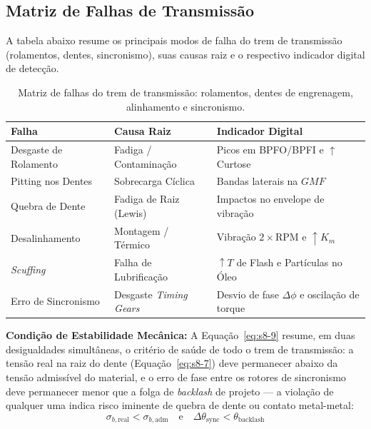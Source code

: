 \documentclass[12pt,a4paper]{article}
\numberwithin{equation}{section}
\numberwithin{table}{section}
\numberwithin{figure}{section}
\begin{document}
	\subsection{\textbf{Matriz de Falhas de Transmissão}}
	A tabela abaixo resume os principais modos de falha do trem de transmissão (rolamentos, dentes, sincronismo), suas causas raiz e o respectivo indicador digital de detecção.
	\begin{table}[h!]
		\centering
		\small
		\renewcommand{\arraystretch}{1.5}
		\begin{tabular}{|l|l|l|}
			\hline
			\textbf{Falha} & \textbf{Causa Raiz} & \textbf{Indicador Digital} \\ \hline
			Desgaste de Rolamento & Fadiga / Contaminação & Picos em BPFO/BPFI e $\uparrow$ Curtose \\ \hline
			Pitting nos Dentes & Sobrecarga Cíclica & Bandas laterais na $GMF$ \\ \hline
			Quebra de Dente & Fadiga de Raiz (Lewis) & Impactos no envelope de vibração \\ \hline
			Desalinhamento & Montagem / Térmico & Vibração $2 \times \text{RPM}$ e $\uparrow K_m$ \\ \hline
			\textit{Scuffing} & Falha de Lubrificação & $\uparrow T$ de Flash e Partículas no Óleo \\ \hline
			Erro de Sincronismo & Desgaste \textit{Timing Gears} & Desvio de fase $\Delta \phi$ e oscilação de torque \\ \hline
		\end{tabular}
		\caption{Matriz de falhas do trem de transmissão: rolamentos, dentes de engrenagem, alinhamento e sincronismo.}
	\end{table}
	
	\vspace{1em}
	\textbf{Condição de Estabilidade Mecânica:} A Equação~\eqref{eq:s8-9} resume, em duas desigualdades simultâneas, o critério de saúde de todo o trem de transmissão: a tensão real na raiz do dente (Equação~\eqref{eq:s8-7}) deve permanecer abaixo da tensão admissível do material, e o erro de fase entre os rotores de sincronismo deve permanecer menor que a folga de \textit{backlash} de projeto — a violação de qualquer uma indica risco iminente de quebra de dente ou contato metal-metal:
	\begin{equation}\label{eq:s8-9}
 \boxed{\sigma_{b, \text{real}} < \sigma_{b, \text{adm}} \quad \text{e} \quad \Delta \theta_{\text{sync}} < \theta_{\text{backlash}}}
\end{equation}
\end{document}
